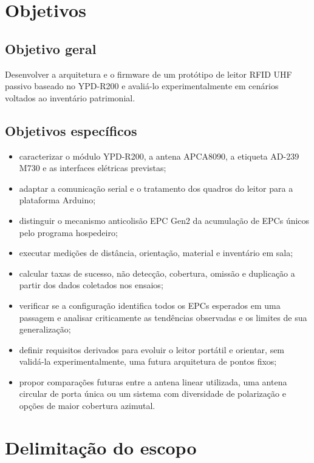 \section{Objetivos}

\subsection{Objetivo geral}

Desenvolver a arquitetura e o firmware de um protótipo de leitor RFID UHF passivo baseado no YPD-R200 e avaliá-lo experimentalmente em cenários voltados ao inventário patrimonial.

\subsection{Objetivos específicos}

\begin{itemize}
    \setlength{\itemsep}{0pt}
    \setlength{\parskip}{0pt}
    \item caracterizar o módulo YPD-R200, a antena APCA8090, a etiqueta AD-239 M730 e as interfaces elétricas previstas;
    \item adaptar a comunicação serial e o tratamento dos quadros do leitor para a plataforma Arduino;
    \item distinguir o mecanismo anticolisão EPC Gen2 da acumulação de EPCs únicos pelo programa hospedeiro;
    \item executar medições de distância, orientação, material e inventário em sala;
    \item calcular taxas de sucesso, não detecção, cobertura, omissão e duplicação a partir dos dados coletados nos ensaios;
    \item verificar se a configuração identifica todos os EPCs esperados em uma passagem e analisar criticamente as tendências observadas e os limites de sua generalização;
    \item definir requisitos derivados para evoluir o leitor portátil e orientar, sem validá-la experimentalmente, uma futura arquitetura de pontos fixos;
    \item propor comparações futuras entre a antena linear utilizada, uma antena circular de porta única ou um sistema com diversidade de polarização e opções de maior cobertura azimutal.
\end{itemize}

\section{Delimitação do escopo}

